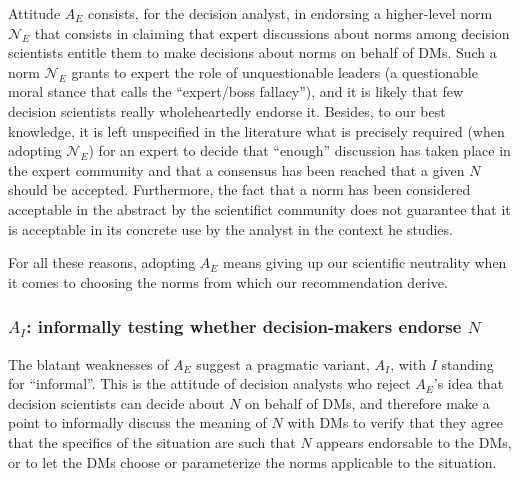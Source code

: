 \documentclass[preprint, french, english, 11pt, authoryear]{elsarticle}%
\newcommand{\protectforpdf}[1]{\texorpdfstring{\ensuremath{#1}}{#1}}
\begin{document}
Attitude $A_E$ consists, for the decision analyst, in endorsing a higher-level norm $\mathscr{N}_E$ that consists in claiming that expert discussions about norms among decision scientists entitle them to make decisions about norms on behalf of \acp{DM}. Such a norm $\mathscr{N}_E$ grants to expert the role of unquestionable leaders (a questionable moral stance that \citet{estlund_democratic_2009} calls the ``expert/boss fallacy''), and it is likely that few decision scientists really wholeheartedly endorse it. Besides, to our best knowledge, it is left unspecified in the literature what is precisely required (when adopting  $\mathscr{N}_E$) for an expert to decide that “enough” discussion has taken place in the expert community and that a consensus has been reached that a given $N$ should be accepted. Furthermore, the fact that a norm has been considered acceptable in the abstract by the scientifict community does not guarantee that it is acceptable in its concrete use by the analyst in the context he studies.

For all these reasons, adopting $A_E$ means giving up our scientific neutrality when it comes to choosing the norms from which our recommendation derive. 

\subsubsection{\texorpdfstring{$A_I$}{AI}: informally testing whether decision-makers endorse \protectforpdf{N}}
The blatant weaknesses of $A_E$ suggest a pragmatic variant, $A_I$, with $I$ standing for “informal”. This is the attitude of decision analysts who reject $A_E$'s idea that decision scientists can decide about $N$ on behalf of \acp{DM}, and therefore make a point to informally discuss the meaning of $N$ with \acp{DM} to verify that they agree that the specifics of the situation are such that $N$ appears endorsable to the \acp{DM}, or to let the \acp{DM} choose or parameterize the norms applicable to the situation.
\end{document}

